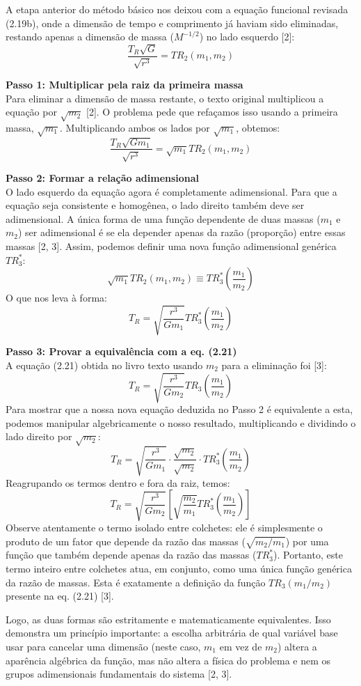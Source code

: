 A etapa anterior do método básico nos deixou com a equação funcional revisada (2.19b), onde a dimensão de tempo e comprimento já haviam sido eliminadas, restando apenas a dimensão de massa ($M^{-1/2}$) no lado esquerdo [2]:
$$ \frac{T_R \sqrt{G}}{\sqrt{r^3}} = TR_2(m_1, m_2) $$

\vspace{0.3cm}
\textbf{Passo 1: Multiplicar pela raiz da primeira massa} \\
Para eliminar a dimensão de massa restante, o texto original multiplicou a equação por $\sqrt{m_2}$ [2]. O problema pede que refaçamos isso usando a primeira massa, $\sqrt{m_1}$. Multiplicando ambos os lados por $\sqrt{m_1}$, obtemos:
$$ \frac{T_R \sqrt{G m_1}}{\sqrt{r^3}} = \sqrt{m_1} TR_2(m_1, m_2) $$

\vspace{0.3cm}
\textbf{Passo 2: Formar a relação adimensional} \\
O lado esquerdo da equação agora é completamente adimensional. Para que a equação seja consistente e homogênea, o lado direito também deve ser adimensional. A única forma de uma função dependente de duas massas ($m_1$ e $m_2$) ser adimensional é se ela depender apenas da razão (proporção) entre essas massas [2, 3]. Assim, podemos definir uma nova função adimensional genérica $TR_3^*$:
$$ \sqrt{m_1} TR_2(m_1, m_2) \equiv TR_3^*\left(\frac{m_1}{m_2}\right) $$
O que nos leva à forma:
$$ T_R = \sqrt{\frac{r^3}{G m_1}} TR_3^*\left(\frac{m_1}{m_2}\right) $$

\vspace{0.3cm}
\textbf{Passo 3: Provar a equivalência com a eq. (2.21)} \\
A equação (2.21) obtida no livro texto usando $m_2$ para a eliminação foi [3]:
$$ T_R = \sqrt{\frac{r^3}{G m_2}} TR_3\left(\frac{m_1}{m_2}\right) $$
Para mostrar que a nossa nova equação deduzida no Passo 2 é equivalente a esta, podemos manipular algebricamente o nosso resultado, multiplicando e dividindo o lado direito por $\sqrt{m_2}$:
$$ T_R = \sqrt{\frac{r^3}{G m_1}} \cdot \frac{\sqrt{m_2}}{\sqrt{m_2}} \cdot TR_3^*\left(\frac{m_1}{m_2}\right) $$
Reagrupando os termos dentro e fora da raiz, temos:
$$ T_R = \sqrt{\frac{r^3}{G m_2}} \left[ \sqrt{\frac{m_2}{m_1}} TR_3^*\left(\frac{m_1}{m_2}\right) \right] $$
Observe atentamente o termo isolado entre colchetes: ele é simplesmente o produto de um fator que depende da razão das massas ($\sqrt{m_2/m_1}$) por uma função que também depende apenas da razão das massas ($TR_3^*$). Portanto, este termo inteiro entre colchetes atua, em conjunto, como uma única função genérica da razão de massas. Esta é exatamente a definição da função $TR_3(m_1/m_2)$ presente na eq. (2.21) [3].

Logo, as duas formas são estritamente e matematicamente equivalentes. Isso demonstra um princípio importante: a escolha arbitrária de qual variável base usar para cancelar uma dimensão (neste caso, $m_1$ em vez de $m_2$) altera a aparência algébrica da função, mas não altera a física do problema e nem os grupos adimensionais fundamentais do sistema [2, 3].